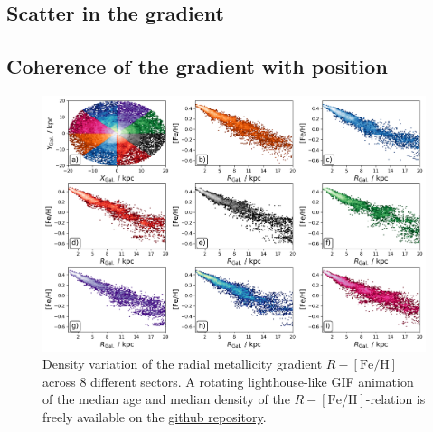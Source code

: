 \documentclass[fleqn,usenatbib]{mnras}
\begin{document}
\subsection{Scatter in the gradient}
\label{sec:scatter_radial_metallicity_gradients}

\subsection{Coherence of the gradient with position}
\label{sec:coherence_position_radial_metallicity_gradients}

\begin{figure}
    \centering
    \includegraphics[width=\textwidth]{figures/radial_metallicity_gradients_mw_in_angles.png}
    \caption{Density variation of the radial metallicity gradient $R-\mathrm{[Fe/H]}$ across 8 different sectors. A rotating lighthouse-like GIF animation of the median age and median density of the $R-\mathrm{[Fe/H]}$-relation is freely available on the \href{https://github.com/svenbuder/nihao_radial_metallicity_gradients/blob/main/figures/xyz_rfeh.gif}{github repository}.}
    \label{fig:radial_metallicity_gradients_mw_in_angles}
\end{figure}
\end{document}
